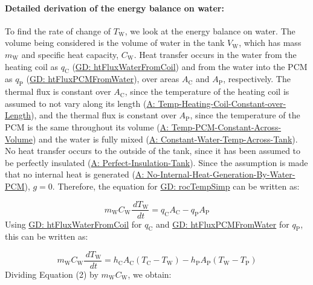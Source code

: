 \documentclass[12pt]{article}
\begin{document}
\paragraph{Detailed derivation of the energy balance on water:}
\label{IM:eBalanceOnWtrDeriv}
To find the rate of change of ${T_{\text{W}}}$, we look at the energy balance on water. The volume being considered is the volume of water in the tank ${V_{\text{W}}}$, which has mass ${m_{\text{W}}}$ and specific heat capacity, ${C_{\text{W}}}$. Heat transfer occurs in the water from the heating coil as ${q_{\text{C}}}$ (\hyperref[GD:htFluxWaterFromCoil]{GD: htFluxWaterFromCoil}) and from the water into the PCM as ${q_{\text{P}}}$ (\hyperref[GD:htFluxPCMFromWater]{GD: htFluxPCMFromWater}), over areas ${A_{\text{C}}}$ and ${A_{\text{P}}}$, respectively. The thermal flux is constant over ${A_{\text{C}}}$, since the temperature of the heating coil is assumed to not vary along its length (\hyperref[assumpTHCCoL]{A: Temp-Heating-Coil-Constant-over-Length}), and the thermal flux is constant over ${A_{\text{P}}}$, since the temperature of the PCM is the same throughout its volume (\hyperref[assumpTPCAV]{A: Temp-PCM-Constant-Across-Volume}) and the water is fully mixed (\hyperref[assumpCWTAT]{A: Constant-Water-Temp-Across-Tank}). No heat transfer occurs to the outside of the tank, since it has been assumed to be perfectly insulated (\hyperref[assumpPIT]{A: Perfect-Insulation-Tank}). Since the assumption is made that no internal heat is generated (\hyperref[assumpNIHGBWP]{A: No-Internal-Heat-Generation-By-Water-PCM}), $g=0$. Therefore, the equation for \hyperref[GD:rocTempSimp]{GD: rocTempSimp} can be written as:

\begin{displaymath}
{m_{\text{W}}} {C_{\text{W}}} \frac{\,d{T_{\text{W}}}}{\,dt}={q_{\text{C}}} {A_{\text{C}}}-{q_{\text{P}}} {A_{\text{P}}}
\end{displaymath}
Using \hyperref[GD:htFluxWaterFromCoil]{GD: htFluxWaterFromCoil} for ${q_{\text{C}}}$ and \hyperref[GD:htFluxPCMFromWater]{GD: htFluxPCMFromWater} for ${q_{\text{P}}}$, this can be written as:

\begin{displaymath}
{m_{\text{W}}} {C_{\text{W}}} \frac{\,d{T_{\text{W}}}}{\,dt}={h_{\text{C}}} {A_{\text{C}}} \left({T_{\text{C}}}-{T_{\text{W}}}\right)-{h_{\text{P}}} {A_{\text{P}}} \left({T_{\text{W}}}-{T_{\text{P}}}\right)
\end{displaymath}
Dividing Equation (2) by ${m_{\text{W}}} {C_{\text{W}}}$, we obtain:
\end{document}
